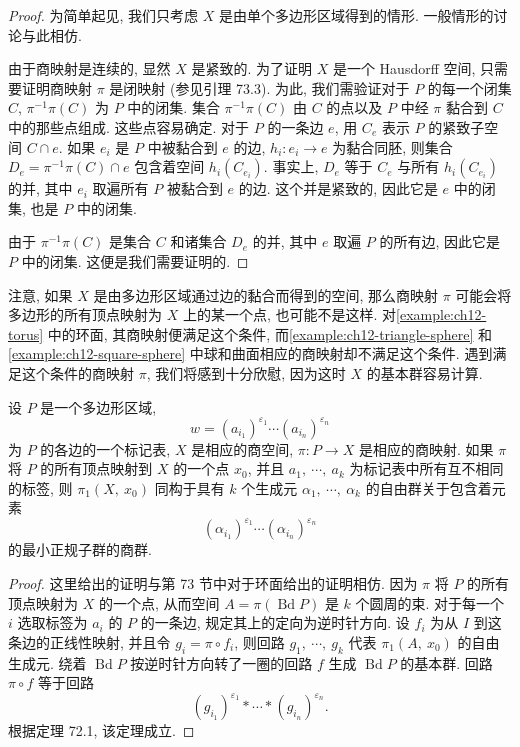\begin{proof}
为简单起见, 我们只考虑 $X$ 是由单个多边形区域得到的情形. 一般情形的讨论与此相仿.

由于商映射是连续的, 显然 $X$ 是紧致的. 为了证明 $X$ 是一个 Hausdorff 空间, 只需要证明商映射 $\pi$ 是闭映射 (参见引理 73.3). 为此, 我们需验证对于 $P$ 的每一个闭集 $C$, $\pi^{-1}\pi(C)$ 为 $P$ 中的闭集. 集合 $\pi^{-1}\pi(C)$ 由 $C$ 的点以及 $P$ 中经 $\pi$ 黏合到 $C$ 中的那些点组成. 这些点容易确定. 对于 $P$ 的一条边 $e$, 用 $C_{e}$ 表示 $P$ 的紧致子空间 $C\cap e$. 如果 $e_{i}$ 是 $P$ 中被黏合到 $e$ 的边, $h_{i}\colon e_{i}\to e$ 为黏合同胚, 则集合 $D_{e}=\pi^{-1}\pi(C)\cap e$ 包含着空间 $h_{i}(C_{e_{i}})$. 事实上, $D_{e}$ 等于 $C_{e}$ 与所有 $h_{i}(C_{e_{i}})$ 的并, 其中 $e_{i}$ 取遍所有 $P$ 被黏合到 $e$ 的边. 这个并是紧致的, 因此它是 $e$ 中的闭集, 也是 $P$ 中的闭集.

由于 $\pi^{-1}\pi(C)$ 是集合 $C$ 和诸集合 $D_{e}$ 的并, 其中 $e$ 取遍 $P$ 的所有边, 因此它是 $P$ 中的闭集. 这便是我们需要证明的.
\end{proof}

注意, 如果 $X$ 是由多边形区域通过边的黏合而得到的空间, 那么商映射 $\pi$ 可能会将多边形的所有顶点映射为 $X$ 上的某一个点, 也可能不是这样. 对\cref{example:ch12-torus} 中的环面, 其商映射便满足这个条件, 而\cref{example:ch12-triangle-sphere} 和\cref{example:ch12-square-sphere} 中球和曲面相应的商映射却不满足这个条件. 遇到满足这个条件的商映射 $\pi$, 我们将感到十分欣慰, 因为这时 $X$ 的基本群容易计算.

\begin{theorem}[黏合空间的基本群]
\label{theorem:ch12-pasted-space-pi1}
设 $P$ 是一个多边形区域,
\[
w=(a_{i_{1}})^{\varepsilon_{1}}\cdots(a_{i_{n}})^{\varepsilon_{n}}
\]
为 $P$ 的各边的一个标记表, $X$ 是相应的商空间, $\pi\colon P\to X$ 是相应的商映射. 如果 $\pi$ 将 $P$ 的所有顶点映射到 $X$ 的一个点 $x_{0}$, 并且 $a_{1},\ \cdots,\ a_{k}$ 为标记表中所有互不相同的标签, 则 $\pi_{1}(X,\ x_{0})$ 同构于具有 $k$ 个生成元 $\alpha_{1},\ \cdots,\ \alpha_{k}$ 的自由群关于包含着元素
\[
(\alpha_{i_{1}})^{\varepsilon_{1}}\cdots(\alpha_{i_{n}})^{\varepsilon_{n}}
\]
的最小正规子群的商群.
\end{theorem}

\begin{proof}
这里给出的证明与第 73 节中对于环面给出的证明相仿. 因为 $\pi$ 将 $P$ 的所有顶点映射为 $X$ 的一个点, 从而空间 $A=\pi(\operatorname{Bd}P)$ 是 $k$ 个圆周的束. 对于每一个 $i$ 选取标签为 $a_{i}$ 的 $P$ 的一条边, 规定其上的定向为逆时针方向. 设 $f_{i}$ 为从 $I$ 到这条边的正线性映射, 并且令 $g_{i}=\pi\circ f_{i}$, 则回路 $g_{1},\ \cdots,\ g_{k}$ 代表 $\pi_{1}(A,\ x_{0})$ 的自由生成元. 绕着 $\operatorname{Bd}P$ 按逆时针方向转了一圈的回路 $f$ 生成 $\operatorname{Bd}P$ 的基本群. 回路 $\pi\circ f$ 等于回路
\[
(g_{i_{1}})^{\varepsilon_{1}}*\cdots*(g_{i_{n}})^{\varepsilon_{n}}.
\]
根据定理 72.1, 该定理成立.
\end{proof}

